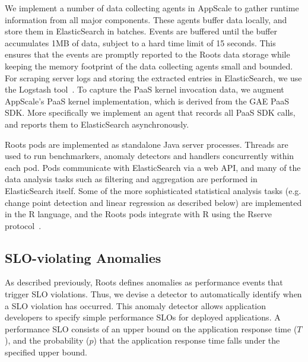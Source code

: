 We implement a number of data collecting agents in AppScale to gather runtime information
from all major components. These agents buffer data locally, and store them in ElasticSearch
in batches. Events are buffered until the buffer accumulates 1MB of data, subject to a hard time limit of 
15 seconds. This ensures that the events are promptly reported to the Roots data
storage while keeping the memory footprint of the data collecting agents small and bounded. 
For scraping server logs and storing the extracted entries in ElasticSearch,
we use the Logstash tool~\cite{logstash}. 
To capture the PaaS kernel invocation data, we augment AppScale's PaaS kernel implementation,
which is derived from the GAE PaaS SDK. More specifically we implement an agent that records
all PaaS SDK calls, and reports them to ElasticSearch asynchronously. 

Roots pods are implemented as standalone Java server processes. Threads are used to run benchmarkers,
anomaly detectors and handlers concurrently within each pod. Pods communicate with ElasticSearch via
a web API, and many of the data analysis tasks such as filtering and aggregation are performed
in ElasticSearch itself. 
Some of the more sophisticated statistical analysis tasks (e.g. change point detection and 
linear regression as described below) are implemented in the R
language, and the Roots pods integrate with R using the Rserve protocol~\cite{Urbanek03rserve--}.

\subsection{SLO-violating Anomalies}

As described previously,
Roots defines anomalies as performance events that trigger SLO
violations. Thus, we devise a detector to automatically identify when a SLO
violation has occurred. This anomaly detector
allows application developers to specify simple performance SLOs for deployed applications. A
performance SLO consists of an upper bound on the application response time ($T$), and the probability ($p$)
that the application response time falls under the specified upper bound. 


